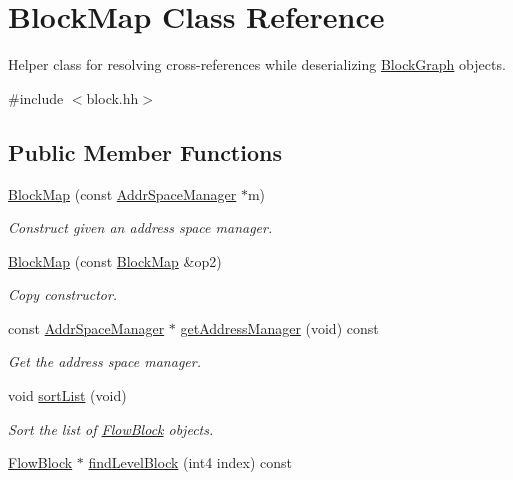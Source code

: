 \hypertarget{class_block_map}{}\section{Block\+Map Class Reference}
\label{class_block_map}


Helper class for resolving cross-\/references while deserializing \mbox{\hyperlink{class_block_graph}{Block\+Graph}} objects.  




{\ttfamily \#include $<$block.\+hh$>$}

\subsection*{Public Member Functions}
\begin{DoxyCompactItemize}
\item 
\mbox{\hyperlink{class_block_map_accf96e219abfacdbbf70f95cf6d945a3}{Block\+Map}} (const \mbox{\hyperlink{class_addr_space_manager}{Addr\+Space\+Manager}} $\ast$m)
\begin{DoxyCompactList}\small\item\em Construct given an address space manager. \end{DoxyCompactList}\item 
\mbox{\hyperlink{class_block_map_a4f9c51fe087f6ec59af2c970b2ac2198}{Block\+Map}} (const \mbox{\hyperlink{class_block_map}{Block\+Map}} \&op2)
\begin{DoxyCompactList}\small\item\em Copy constructor. \end{DoxyCompactList}\item 
const \mbox{\hyperlink{class_addr_space_manager}{Addr\+Space\+Manager}} $\ast$ \mbox{\hyperlink{class_block_map_ae320132fd4805cb28efb2c02f7d2e3a7}{get\+Address\+Manager}} (void) const
\begin{DoxyCompactList}\small\item\em Get the address space manager. \end{DoxyCompactList}\item 
void \mbox{\hyperlink{class_block_map_af56f54d880b34ee2097765f1eb2cbf8e}{sort\+List}} (void)
\begin{DoxyCompactList}\small\item\em Sort the list of \mbox{\hyperlink{class_flow_block}{Flow\+Block}} objects. \end{DoxyCompactList}\item 
\mbox{\hyperlink{class_flow_block}{Flow\+Block}} $\ast$ \mbox{\hyperlink{class_block_map_abc5d592bf94c4e29c6a0efbcd1890883}{find\+Level\+Block}} (int4 index) const

\end{DoxyCompactItemize}
